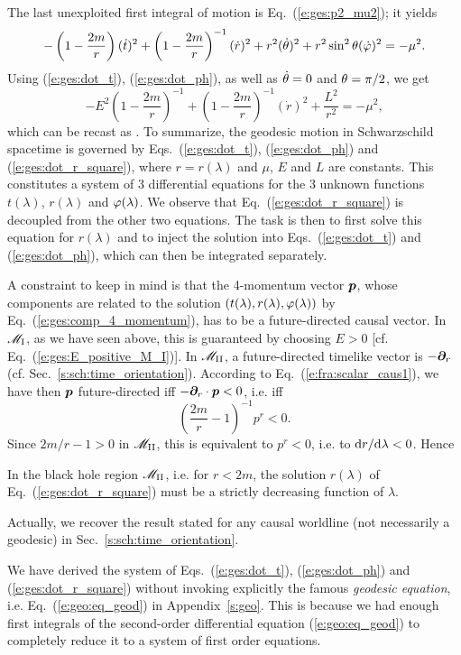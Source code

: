 The last unexploited first integral of motion is Eq.~(\ref{e:ges:p2_mu2}); it
yields
\[
   - \left( 1 - \frac{2m}{r} \right) (\dot{t})^2 +
   \left( 1 - \frac{2m}{r} \right) ^{-1}  (\dot{r})^2
   + r^2 (\dot{\theta})^2 + r^2 \sin^2\theta (\dot{\varphi})^2  = - \mu^2 .
\]
Using (\ref{e:ges:dot_t}), (\ref{e:ges:dot_ph}), as well as
$\dot{\theta}=0$ and $\theta=\pi/2$, we get
\[
    -  E^2 \left(1 - \frac{2m}{r} \right) ^{-1}
    +  \left( 1 - \frac{2m}{r} \right) ^{-1}  (\dot{r})^2
    +  \frac{L^2}{r^2} = - \mu^2 ,
\]
which can be recast as
\be \label{e:ges:dot_r_square}
     .
\ee
To summarize, the geodesic motion in Schwarzschild spacetime is governed by
Eqs.~(\ref{e:ges:dot_t}), (\ref{e:ges:dot_ph}) and (\ref{e:ges:dot_r_square}),
where $r=r(\lambda)$ and $\mu$, $E$ and $L$ are constants.
This constitutes a system of 3 differential equations for the 3 unknown
functions $t(\lambda)$, $r(\lambda)$ and $\varphi(\lambda)$.
We observe
that Eq.~(\ref{e:ges:dot_r_square}) is decoupled from the other two equations.
The task is then to first solve this equation for $r(\lambda)$ and to inject
the solution into Eqs.~(\ref{e:ges:dot_t}) and (\ref{e:ges:dot_ph}), which
can then be integrated separately.

A constraint to keep in mind is that the 4-momentum vector $\bm{p}$, whose
components are related to the solution $(t(\lambda), r(\lambda), \varphi(\lambda))$
by Eq.~(\ref{e:ges:comp_4_momentum}), has to be a future-directed causal vector.
In $\mathscr{M}_{\rm I}$, as we have seen above, this is guaranteed by choosing $E > 0$
[cf. Eq.~(\ref{e:ges:E_positive_M_I})]. In $\mathscr{M}_{\rm II}$, a future-directed
timelike vector is $-\bm{\partial}_r$ (cf. Sec.~\ref{s:sch:time_orientation}).
According to Eq.~(\ref{e:fra:scalar_caus1}), we have then
$\bm{p}$ future-directed iff $-\bm{\partial}_r\cdot\bm{p} < 0$, i.e. iff
\[
    \left(\frac{2m}{r} - 1  \right) ^{-1} p^r < 0  .
\]
Since $2m/r - 1 > 0$ in $\mathscr{M}_{\rm II}$, this is equivalent to $p^r < 0$, i.e.
to $\mathrm{d} r/\mathrm{d}\lambda < 0$. Hence
\begin{greybox}
In the black hole region $\mathscr{M}_{\rm II}$, i.e. for $r<2m$,
the solution $r(\lambda)$ of Eq.~(\ref{e:ges:dot_r_square})
must be a strictly decreasing function of $\lambda$.
\end{greybox}
Actually, we recover the result stated for any causal worldline (not necessarily
a geodesic) in Sec.~\ref{s:sch:time_orientation}.

\begin{remark}
We have derived the system of Eqs.~(\ref{e:ges:dot_t}), (\ref{e:ges:dot_ph}) and (\ref{e:ges:dot_r_square}) without invoking explicitly the
famous \emph{geodesic equation}, i.e.
Eq.~(\ref{e:geo:eq_geod}) in Appendix~\ref{s:geo}.
This is because we had enough
first integrals of the second-order differential equation
(\ref{e:geo:eq_geod})
to completely reduce it to
a system of first order equations.
\end{remark}

